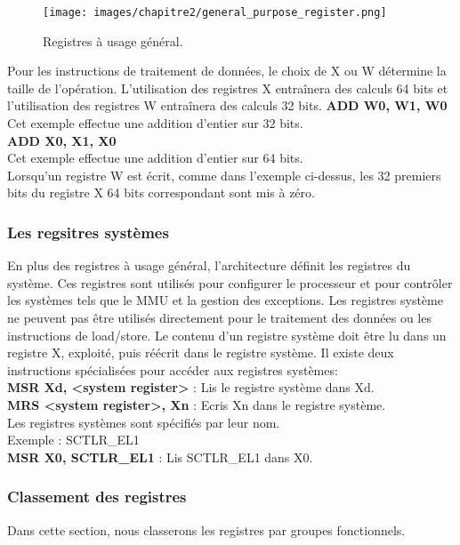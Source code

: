 \documentclass[12pt,a4paper,oneside]{book}
\begin{document}
	\begin{figure}[H]
		\centering
		\texttt{[image: images/chapitre2/general\_purpose\_register.png]}
		\caption{Registres à usage général.}
		\label{Types}
	\end{figure}

	Pour les instructions de traitement de données, le choix de X ou W détermine la taille de l'opération. L'utilisation des registres X entraînera des calculs 64 bits et l'utilisation des registres W entraînera des calculs 32 bits.
	\textbf{ADD W0, W1, W0}\\ 
	Cet exemple effectue une addition d'entier sur 32 bits.\\
	
	\textbf{ADD X0, X1, X0}\\ 
	Cet exemple effectue une addition d'entier sur 64 bits.\\
	\newline
	Lorsqu'un registre W est écrit, comme dans l'exemple ci-dessus, les 32 premiers bits du registre X 64 bits correspondant sont mis à zéro.	

	\subsubsection{Les regsitres systèmes}
	En plus des registres à usage général, l'architecture définit les registres du système. Ces registres sont utilisés pour configurer le processeur et pour contrôler les systèmes tels que le MMU et la gestion des exceptions. Les registres système ne peuvent pas être utilisés directement pour le traitement des données ou les instructions de load/store. Le contenu d'un registre système doit être lu dans un registre X, exploité, puis réécrit dans le registre système. Il existe deux instructions spécialisées pour accéder aux registres systèmes: \\
	\textbf{MSR Xd, <system register>} : Lis le registre système dans Xd.\\

	\textbf{MRS <system register>, Xn} : Ecris Xn dans le registre système.\\

	Les registres systèmes sont spécifiés par leur nom.\\ 
	Exemple : SCTLR\_EL1\\
	\textbf{MSR X0, SCTLR\_EL1} : Lis SCTLR\_EL1 dans X0.\\

	\subsubsection{Classement des registres} 
	Dans cette section, nous classerons les registres par groupes fonctionnels.\\
	
\end{document}
